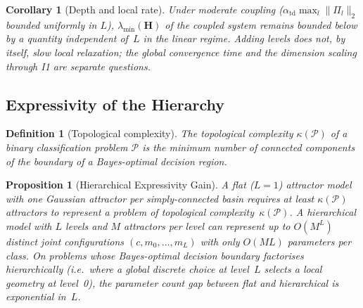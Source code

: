 \documentclass[11pt,a4paper]{article}
\newtheorem{proposition}[theorem]{Proposition}
\newtheorem{corollary}[theorem]{Corollary}
\newtheorem{definition}[theorem]{Definition}
\begin{document}
\begin{corollary}[Depth and local rate]
\label{cor:depth}
Under moderate coupling ($\alpha_{\mathrm{td}}\max_l\|\Pi_l\|_2$ bounded uniformly in
$L$), $\lambda_{\min}(\mathbf{H})$ of the coupled system remains bounded below by a
quantity independent of~$L$ in the linear regime. Adding levels does not, by itself,
slow local relaxation; the global convergence time and the dimension scaling through
I1 are separate questions.
\end{corollary}

\subsection{Expressivity of the Hierarchy}
\label{sec:theory:expressivity}

\begin{definition}[Topological complexity]
The topological complexity $\kappa(\mathcal{P})$ of a binary classification problem
$\mathcal{P}$ is the minimum number of connected components of the boundary of a Bayes-optimal
decision region.
\end{definition}

\begin{proposition}[Hierarchical Expressivity Gain]
\label{prop:expressivity}
A flat ($L=1$) attractor model with one Gaussian attractor per simply-connected basin
requires at least $\kappa(\mathcal{P})$ attractors to represent a problem of topological
complexity~$\kappa(\mathcal{P})$. A hierarchical model with $L$ levels and $M$ attractors
per level can represent up to $O(M^L)$ distinct joint configurations $(c,m_0,\ldots,m_L)$
with only $O(ML)$ parameters per class. On problems whose Bayes-optimal decision boundary
factorises hierarchically (i.e.\ where a global discrete choice at level~$L$ selects a
local geometry at level~0), the parameter count gap between flat and hierarchical is
\emph{exponential in~$L$}.
\end{proposition}
\end{document}
